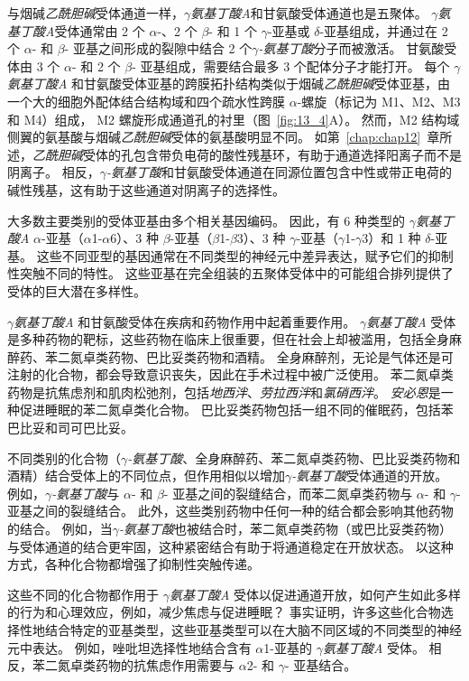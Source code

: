 与烟碱\textit{乙酰胆碱}受体通道一样，\textit{$\gamma$氨基丁酸A}和甘氨酸受体通道也是五聚体。
\textit{$\gamma$氨基丁酸A}受体通常由 2 个 $\alpha$-、2 个 $\beta$- 和 1 个 $\gamma$-亚基或 $\delta$-亚基组成，并通过在 2 个 $\alpha$- 和 $\beta$- 亚基之间形成的裂隙中结合 2 个\textit{$\gamma$-氨基丁酸}分子而被激活。
甘氨酸受体由 3 个 $\alpha$- 和 2 个 $\beta$- 亚基组成，需要结合最多 3 个配体分子才能打开。
每个 \textit{$\gamma$氨基丁酸A} 和甘氨酸受体亚基的跨膜拓扑结构类似于烟碱\textit{乙酰胆碱}受体亚基，由一个大的细胞外配体结合结构域和四个疏水性跨膜 $\alpha$-螺旋（标记为 M1、M2、M3 和 M4）组成， M2 螺旋形成通道孔的衬里（图~\ref{fig:13_4}A）。
然而，M2 结构域侧翼的氨基酸与烟碱\textit{乙酰胆碱}受体的氨基酸明显不同。
如第~\ref{chap:chap12}~章所述，\textit{乙酰胆碱}受体的孔包含带负电荷的酸性残基环，有助于通道选择阳离子而不是阴离子。
相反，\textit{$\gamma$-氨基丁酸}和甘氨酸受体通道在同源位置包含中性或带正电荷的碱性残基，这有助于这些通道对阴离子的选择性。


大多数主要类别的受体亚基由多个相关基因编码。
因此，有 6 种类型的 \textit{$\gamma$氨基丁酸A} $\alpha$-亚基（$\alpha$1-$\alpha$6）、3 种 $\beta$-亚基（$\beta$1-$\beta$3）、3 种 $\gamma$-亚基（$\gamma$1-$\gamma$3）和 1 种 $\delta$-亚基。
这些不同亚型的基因通常在不同类型的神经元中差异表达，赋予它们的抑制性突触不同的特性。
这些亚基在完全组装的五聚体受体中的可能组合排列提供了受体的巨大潜在多样性。


\textit{$\gamma$氨基丁酸A} 和甘氨酸受体在疾病和药物作用中起着重要作用。
\textit{$\gamma$氨基丁酸A} 受体是多种药物的靶标，这些药物在临床上很重要，但在社会上却被滥用，包括全身麻醉药、苯二氮卓类药物、巴比妥类药物和酒精。
全身麻醉剂，无论是气体还是可注射的化合物，都会导致意识丧失，因此在手术过程中被广泛使用。
苯二氮卓类药物是抗焦虑剂和肌肉松弛剂，包括\textit{地西泮}、\textit{劳拉西泮}和\textit{氯硝西泮}。
\textit{安必恩}是一种促进睡眠的苯二氮卓类化合物。
巴比妥类药物包括一组不同的催眠药，包括苯巴比妥和司可巴比妥。


不同类别的化合物（\textit{$\gamma$-氨基丁酸}、全身麻醉药、苯二氮卓类药物、巴比妥类药物和酒精）结合受体上的不同位点，但作用相似以增加\textit{$\gamma$-氨基丁酸}受体通道的开放。
例如，\textit{$\gamma$-氨基丁酸}与 $\alpha$- 和 $\beta$- 亚基之间的裂缝结合，而苯二氮卓类药物与 $\alpha$- 和 $\gamma$- 亚基之间的裂缝结合。
此外，这些类别药物中任何一种的结合都会影响其他药物的结合。
例如，当\textit{$\gamma$-氨基丁酸}也被结合时，苯二氮卓类药物（或巴比妥类药物）与受体通道的结合更牢固，这种紧密结合有助于将通道稳定在开放状态。
以这种方式，各种化合物都增强了抑制性突触传递。


这些不同的化合物都作用于 \textit{$\gamma$氨基丁酸A} 受体以促进通道开放，如何产生如此多样的行为和心理效应，例如，减少焦虑与促进睡眠？
事实证明，许多这些化合物选择性地结合特定的亚基类型，这些亚基类型可以在大脑不同区域的不同类型的神经元中表达。
例如，唑吡坦选择性地结合含有 $\alpha$1-亚基的 \textit{$\gamma$氨基丁酸A} 受体。
相反，苯二氮卓类药物的抗焦虑作用需要与 $\alpha$2- 和 $\gamma$- 亚基结合。



